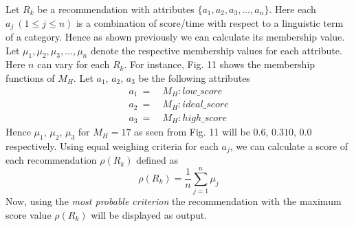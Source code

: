 \documentclass[conference]{IEEEtran}
\begin{document}
Let $R_k$ be a recommendation with attributes $\{a_1, a_2, a_3, \ldots, a_n\}$. Here each $a_j\ (1 \leq j \leq n)$ is a combination of score/time with respect to a linguistic term of a category. Hence as shown previously we can calculate its membership value. Let $\mu_1, \mu_2, \mu_3, \ldots, \mu_n$ denote the respective membership values for each attribute. Here $n$ can vary for each $R_k$.  For instance, Fig. 11 shows the membership functions of $M_H$. Let $a_1$, $a_2$, $a_3$ be the following attributes
\begin{align*}
a_1\ =&\ M_H:low\_score\\
a_2\ =&\ M_H:ideal\_score\\
a_3\ =&\ M_H:high\_score
\end{align*}
Hence $\mu_1$, $\mu_2$, $\mu_3$ for $M_H=17$ as seen from Fig. 11 will be $0.6$, $0.310$, $0.0$ respectively. Using equal weighing criteria for each $a_j$, we can calculate a score of each recommendation $\rho(R_k)$ defined as
$$\rho(R_k) = \frac{1}{n}\sum_{j=1}^{n} \mu_j$$
Now, using the \textit{most probable criterion} the recommendation with the maximum score value $\rho(R_k)$ will be displayed as output.
\end{document}
